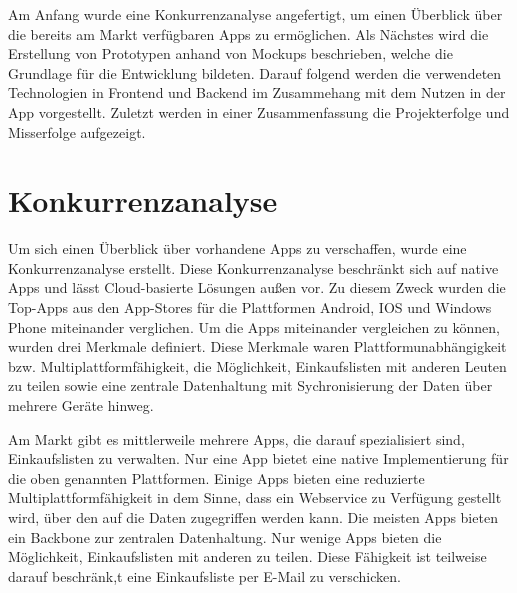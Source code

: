 \documentclass[10pt, conference, compsocconf]{IEEEtran}
\begin{document}
Am Anfang wurde eine Konkurrenzanalyse angefertigt, um einen \"Uberblick \"uber die bereits am Markt verf\"ugbaren Apps zu erm\"oglichen.
Als N\"achstes wird die Erstellung von Prototypen anhand von Mockups beschrieben, welche die Grundlage f\"ur die Entwicklung bildeten.
Darauf folgend werden die verwendeten Technologien in Frontend und Backend im Zusammehang mit dem Nutzen in der App vorgestellt. Zuletzt werden in einer Zusammenfassung die Projekterfolge und Misserfolge aufgezeigt.

\section{Konkurrenzanalyse}
Um sich einen \"Uberblick \"uber vorhandene Apps zu verschaffen, wurde eine Konkurrenzanalyse erstellt.
Diese Konkurrenzanalyse beschr\"ankt sich auf native Apps und l\"asst Cloud-basierte L\"osungen au{\ss}en vor.
Zu diesem Zweck wurden die Top-Apps aus den App-Stores f\"ur die Plattformen Android, IOS und Windows Phone miteinander verglichen.
Um die Apps miteinander vergleichen zu k\"onnen, wurden drei Merkmale definiert. 
Diese Merkmale waren Plattformunabh\"angigkeit bzw. Multiplattformf\"ahigkeit, 
die M\"oglichkeit, Einkaufslisten mit anderen Leuten zu teilen sowie eine zentrale Datenhaltung mit Sychronisierung der Daten \"uber mehrere Ger\"ate hinweg.

Am Markt gibt es mittlerweile mehrere Apps, die darauf spezialisiert sind, Einkaufslisten zu verwalten.
Nur eine App bietet eine native Implementierung f\"ur die oben genannten Plattformen. Einige Apps bieten eine reduzierte Multiplattformf\"ahigkeit in dem Sinne, dass ein Webservice zu Verf\"ugung gestellt wird, \"uber den auf die Daten zugegriffen werden kann.
Die meisten Apps bieten ein Backbone zur zentralen Datenhaltung.
Nur wenige Apps bieten die M\"oglichkeit, Einkaufslisten mit anderen zu teilen. Diese F\"ahigkeit ist teilweise darauf beschr\"ank,t eine Einkaufsliste per E-Mail zu 
verschicken.
\end{document}
